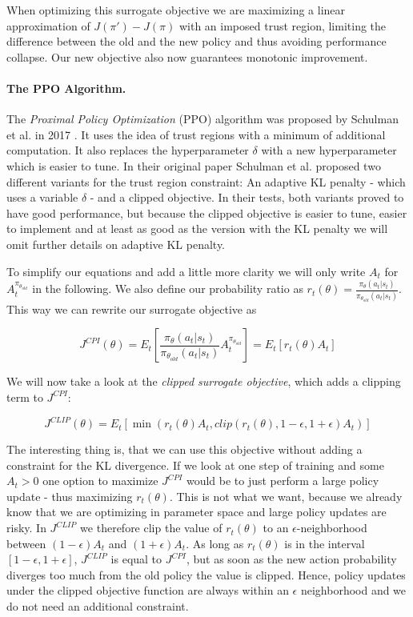 When optimizing this surrogate objective we are maximizing a linear approximation of $J(\pi') - J(\pi)$ with an imposed trust region, limiting the difference between the old and the new policy and thus avoiding performance collapse. Our new objective also now guarantees monotonic improvement.

\paragraph{The PPO Algorithm.}
The \textit{Proximal Policy Optimization} (PPO) algorithm was proposed by Schulman et al. in 2017 \cite{schulman2017proximal}. It uses the idea of trust regions with a minimum of additional computation. It also replaces the hyperparameter $\delta$ with a new hyperparameter which is easier to tune. In their original paper Schulman et al. proposed two different variants for the trust region constraint: An adaptive KL penalty - which uses a variable $\delta$ - and a clipped objective. In their tests, both variants proved to have good performance, but because the clipped objective is easier to tune, easier to implement and at least as good as the version with the KL penalty we will omit further details on adaptive KL penalty. 

To simplify our equations and add a little more clarity we will only write $A_t$ for $A_t^{\pi_{\theta_{old}}}$ in the following. We also define our probability ratio as $r_t(\theta) = \frac{\pi_\theta(a_t|s_t)}{\pi_{\theta_{old}}(a_t|s_t)}$. This way we can rewrite our surrogate objective as

  \[J^{CPI}(\theta) = E_t\left[\frac{\pi_\theta(a_t|s_t)}{\pi_{\theta_{old}}(a_t|s_t)}A_t^{\pi_{\theta_{old}}}\right] = E_t[r_t(\theta)A_t]\]

We will now take a look at the \textit{clipped surrogate objective}, which adds a clipping term to $J^{CPI}$:

\[J^{CLIP}(\theta) = E_t[\min(r_t(\theta)A_t, clip(r_t(\theta), 1-\epsilon, 1+\epsilon)A_t)]\]

The interesting thing is, that we can use this objective without adding a constraint for the KL divergence. If we look at one step of training and some $A_t > 0$ one option to maximize $J^{CPI}$ would be to just perform a large policy update - thus maximizing $r_t(\theta)$. This is not what we want, because we already know that we are optimizing in parameter space and large policy updates are risky. In $J^{CLIP}$ we therefore clip the value of $r_t(\theta)$ to an $\epsilon$-neighborhood between $(1-\epsilon)A_t$ and $(1+\epsilon)A_t$. As long as $r_t(\theta)$ is in the interval $[1-\epsilon, 1+\epsilon]$, $J^{CLIP}$ is equal to $J^{CPI}$, but as soon as the new action probability diverges too much from the old policy the value is clipped. Hence, policy updates under the clipped objective function are always within an $\epsilon$ neighborhood and we do not need an additional constraint.

